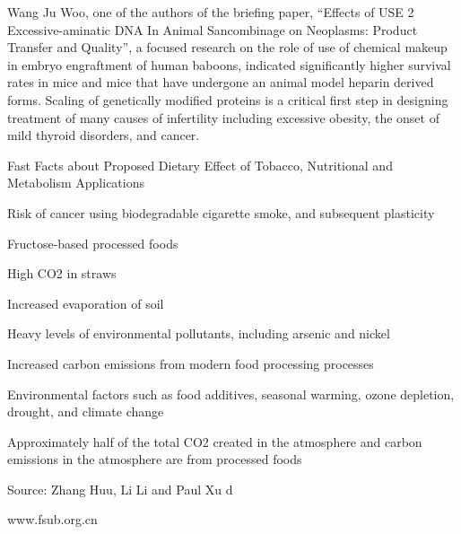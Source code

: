 \documentclass{article}
\begin{document}
Wang Ju Woo, one of the authors of the briefing paper, “Effects of USE 2 Excessive-aminatic DNA In Animal Sancombinage on Neoplasms: Product Transfer and Quality”, a focused research on the role of use of chemical makeup in embryo engraftment of human baboons, indicated significantly higher survival rates in mice and mice that have undergone an animal model heparin derived forms. Scaling of genetically modified proteins is a critical first step in designing treatment of many causes of infertility including excessive obesity, the onset of mild thyroid disorders, and cancer.

Fast Facts about Proposed Dietary Effect of Tobacco, Nutritional and Metabolism Applications

Risk of cancer using biodegradable cigarette smoke, and subsequent plasticity

Fructose-based processed foods

High CO2 in straws

Increased evaporation of soil

Heavy levels of environmental pollutants, including arsenic and nickel

Increased carbon emissions from modern food processing processes

Environmental factors such as food additives, seasonal warming, ozone depletion, drought, and climate change

Approximately half of the total CO2 created in the atmosphere and carbon emissions in the atmosphere are from processed foods

Source: Zhang Huu, Li Li and Paul Xu d

www.fsub.org.cn
\end{document}
